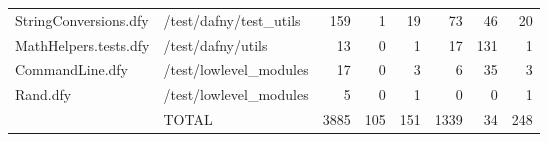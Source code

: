 \documentclass[a4paper, 12pt]{article}
\begin{document}
\begin{tabular}{llrrrrrr}
           StringConversions.dfy &                          /test/dafny/test\_utils &   159 &         1 &               19 &             73 &             46 &      20 \\
           MathHelpers.tests.dfy &                               /test/dafny/utils &    13 &         0 &                1 &             17 &            131 &       1 \\
                 CommandLine.dfy &                          /test/lowlevel\_modules &    17 &         0 &                3 &              6 &             35 &       3 \\
                        Rand.dfy &                          /test/lowlevel\_modules &     5 &         0 &                1 &              0 &              0 &       1 \\
                                 &                                           TOTAL &  3885 &       105 &              151 &           1339 &             34 &     248 \\
\bottomrule
\end{tabular}
\end{document}
